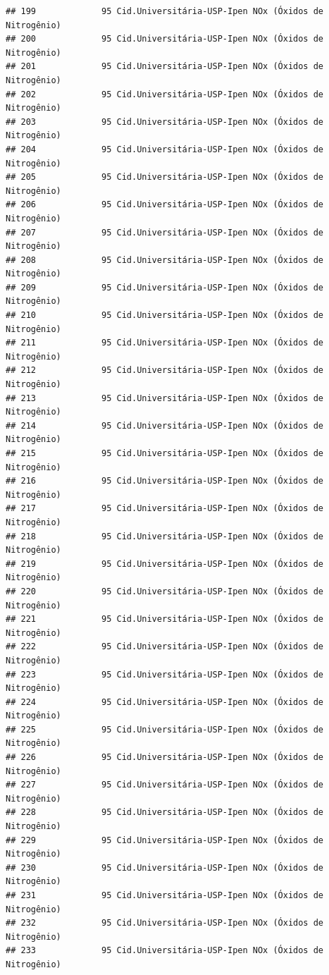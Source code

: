 \documentclass[]{book}
\begin{document}
\begin{verbatim}
## 199             95 Cid.Universitária-USP-Ipen NOx (Óxidos de Nitrogênio)
## 200             95 Cid.Universitária-USP-Ipen NOx (Óxidos de Nitrogênio)
## 201             95 Cid.Universitária-USP-Ipen NOx (Óxidos de Nitrogênio)
## 202             95 Cid.Universitária-USP-Ipen NOx (Óxidos de Nitrogênio)
## 203             95 Cid.Universitária-USP-Ipen NOx (Óxidos de Nitrogênio)
## 204             95 Cid.Universitária-USP-Ipen NOx (Óxidos de Nitrogênio)
## 205             95 Cid.Universitária-USP-Ipen NOx (Óxidos de Nitrogênio)
## 206             95 Cid.Universitária-USP-Ipen NOx (Óxidos de Nitrogênio)
## 207             95 Cid.Universitária-USP-Ipen NOx (Óxidos de Nitrogênio)
## 208             95 Cid.Universitária-USP-Ipen NOx (Óxidos de Nitrogênio)
## 209             95 Cid.Universitária-USP-Ipen NOx (Óxidos de Nitrogênio)
## 210             95 Cid.Universitária-USP-Ipen NOx (Óxidos de Nitrogênio)
## 211             95 Cid.Universitária-USP-Ipen NOx (Óxidos de Nitrogênio)
## 212             95 Cid.Universitária-USP-Ipen NOx (Óxidos de Nitrogênio)
## 213             95 Cid.Universitária-USP-Ipen NOx (Óxidos de Nitrogênio)
## 214             95 Cid.Universitária-USP-Ipen NOx (Óxidos de Nitrogênio)
## 215             95 Cid.Universitária-USP-Ipen NOx (Óxidos de Nitrogênio)
## 216             95 Cid.Universitária-USP-Ipen NOx (Óxidos de Nitrogênio)
## 217             95 Cid.Universitária-USP-Ipen NOx (Óxidos de Nitrogênio)
## 218             95 Cid.Universitária-USP-Ipen NOx (Óxidos de Nitrogênio)
## 219             95 Cid.Universitária-USP-Ipen NOx (Óxidos de Nitrogênio)
## 220             95 Cid.Universitária-USP-Ipen NOx (Óxidos de Nitrogênio)
## 221             95 Cid.Universitária-USP-Ipen NOx (Óxidos de Nitrogênio)
## 222             95 Cid.Universitária-USP-Ipen NOx (Óxidos de Nitrogênio)
## 223             95 Cid.Universitária-USP-Ipen NOx (Óxidos de Nitrogênio)
## 224             95 Cid.Universitária-USP-Ipen NOx (Óxidos de Nitrogênio)
## 225             95 Cid.Universitária-USP-Ipen NOx (Óxidos de Nitrogênio)
## 226             95 Cid.Universitária-USP-Ipen NOx (Óxidos de Nitrogênio)
## 227             95 Cid.Universitária-USP-Ipen NOx (Óxidos de Nitrogênio)
## 228             95 Cid.Universitária-USP-Ipen NOx (Óxidos de Nitrogênio)
## 229             95 Cid.Universitária-USP-Ipen NOx (Óxidos de Nitrogênio)
## 230             95 Cid.Universitária-USP-Ipen NOx (Óxidos de Nitrogênio)
## 231             95 Cid.Universitária-USP-Ipen NOx (Óxidos de Nitrogênio)
## 232             95 Cid.Universitária-USP-Ipen NOx (Óxidos de Nitrogênio)
## 233             95 Cid.Universitária-USP-Ipen NOx (Óxidos de Nitrogênio)

\end{verbatim}
\end{document}
